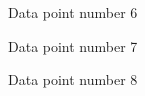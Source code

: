 \documentclass{article}
\begin{document}
\begin{figure}
\centering
{}
\caption{Data point number 6} \label{fig:q1661}
\end{figure}

\begin{figure}
\centering
{}
\caption{Data point number 7} \label{fig:q1671}
\end{figure}

\begin{figure}
\centering
{}
\caption{Data point number 8} \label{fig:q1681}
\end{figure}
\end{document}
